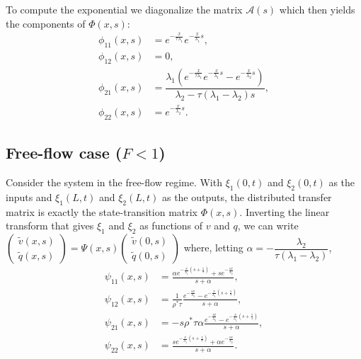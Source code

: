 \documentclass[a4paper, 10pt, conference]{ieeeconf}      %
\begin{document}
To compute the exponential we diagonalize the matrix $\mathscr{A}(s)$
which then yields the components of $\Phi(x,s)$:
{\footnotesize
\begin{subequations} \label{TFv0q0tovxqx}
\begin{align}
\phi_{11}(x,s) &= e^{-\frac{x}{\tau \lambda_1}}e^{-\frac{x}{\lambda_1}s}, \\ 
\phi_{12}(x,s) &= 0, \\
\phi_{21}(x,s) &= \dfrac{\lambda_1 \left( e^{-\frac{x}{\tau \lambda_1}}e^{-\frac{x}{\lambda_1}s} - e^{-\frac{x}{\lambda_2}s}\right)}{\lambda_2 - \tau (\lambda_1 - \lambda_2)s}, \\
\phi_{22}(x,s) &= e^{-\frac{x}{\lambda_2}s}.
\end{align}
\end{subequations}
}

\subsection{Free-flow case ($F<1$)}
Consider the system in the free-flow regime. With $\xi_1 (0,t)$ and $\xi_2 (0,t)$ as the inputs and $\xi_1(L,t)$ and $\xi_2(L,t)$ as the outputs, the distributed transfer matrix is exactly the state-transition matrix $\Phi(x,s)$. Inverting the linear transform that gives $\xi_1$ and $\xi_2$ as functions of $v$ and $q$, we can write
{\footnotesize
$\label{vqfreeflow}
\begin{pmatrix}
	\widetilde{v}(x,s) \\ 
	\widetilde{q}(x,s)
\end{pmatrix} = 
\Psi(x,s)
\begin{pmatrix}
	\widetilde{v}(0,s) \\ 
	\widetilde{q}(0,s)
\end{pmatrix}
$
}
where, letting {\footnotesize$\alpha = -\dfrac{\lambda_2}{\tau(\lambda_1 - \lambda_2)}$},
{\footnotesize
\begin{subequations}
\begin{align}
\psi_{11}(x,s) &= 
\frac{
	\alpha e^{-\frac{x}{\lambda_{1}}\left(s+\frac{1}{\tau}\right)}
		+ s e^{-\frac{sx}{\lambda_{2}}}
}{
	s + \alpha
}, \\
\psi_{12}(x,s) &=
\frac{1}{\rho^* \tau}
\frac{
	e^{-\frac{sx}{\lambda_{2}}}
	-
	e^{-\frac{x}{\lambda_{1}}\left(s+\frac{1}		{\tau}\right)}
}{
	s + \alpha
}, \\
\psi_{21}(x,s) &=
- s \rho^{*} \tau \alpha
\frac{
	e^{-\frac{sx}{\lambda_{2}}}
	-
	e^{-\frac{x}{\lambda_{1}}\left(s+\frac{1}		{\tau}\right)}
}{
	s + \alpha
}, \\
\psi_{22}(x,s) &=
\frac{
	s e^{-\frac{x}{\lambda_{1}}\left(s+\frac{1}{\tau}\right)}
		+ \alpha e^{-\frac{sx}{\lambda_{2}}}
}{
	s + \alpha
}.
\end{align}
\end{subequations}
}
\end{document}
